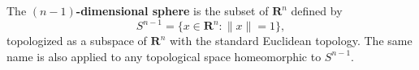 The \textbf{$(n-1)$-dimensional sphere} is the subset of $\mathbf{R}^n$ defined by
\[
S^{n-1} = \{x \in \mathbf{R}^n : \|x\| = 1\},
\]
topologized as a subspace of $\mathbf{R}^n$ with the standard Euclidean topology. The same name is also applied to any topological space homeomorphic to $S^{n-1}$.
